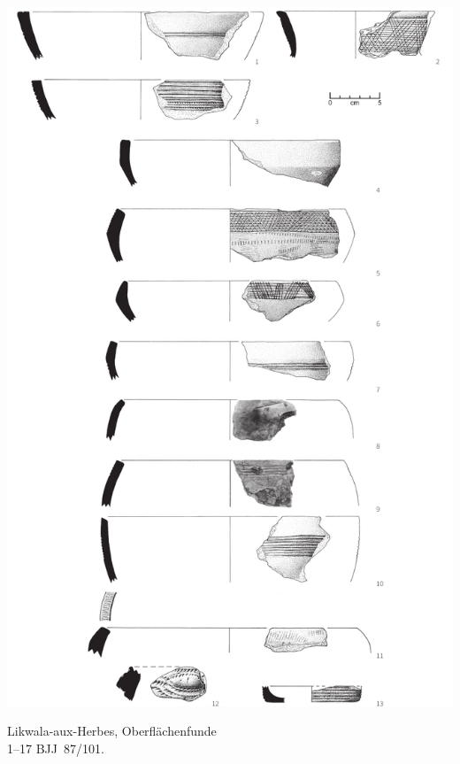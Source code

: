 \begin{pl}[H]
	\includegraphics{plt/Taf78.pdf}
	\vspace{.75em}\caption{Likwala-aux-Herbes, Oberflächenfunde \\ 1--17 BJJ~87/101.}
	\label{pl:78}
\end{pl}

